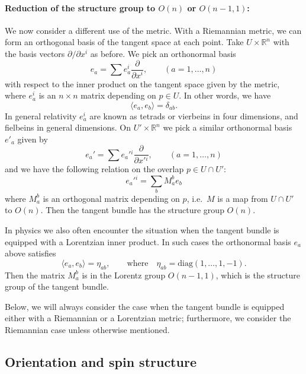 \documentclass[12pt]{article}
\numberwithin{equation}{section}
\numberwithin{figure}{section}
\theoremstyle{remark}
\def\bR{\mathbb{R}}
\begin{document}
\paragraph{Reduction of the structure group to $O(n)$ or $O(n-1,1)$:}
We now consider a different use of the metric.
With a Riemannian metric, we can form an orthogonal basis of the tangent space at each point.
Take $U\times \bR^n$ with the basis vectors $\partial/\partial x^i$ as before.
We pick an orthonormal basis \begin{equation}
  e_a = \sum e_a^i \frac{\partial}{\partial x^i},
  \qquad (a=1,\ldots,n)
\end{equation} with respect to the inner product on the tangent space given by the metric,
where $e_a^i$ is an $n\times n$ matrix depending on $p\in U$.
In other words, we have \begin{equation}
\langle e_a, e_b \rangle = \delta_{ab}.
\end{equation}
In general relativity $e_a^i$ are known as tetrads or vierbeins 
in four dimensions, and fielbeins in general dimensions.
On $U'\times \bR^n$ we pick a similar orthonormal basis $e'_a$
given by \begin{equation}
  e_a' = \sum e_a'{}^i \frac{\partial}{\partial x'{}^i},
  \qquad (a=1,\ldots,n)
\end{equation}
and we have the following relation on the overlap $p\in U\cap U'$:  \begin{equation}
  e_a'{}^i = \sum_b M_a^b e_b
\end{equation} 
where $M_a^b$ is an orthogonal matrix depending on $p$,
i.e.~$M$ is a map from $U\cap U'$ to $O(n)$.
Then the tangent bundle has the structure group $O(n)$.

In physics we also often encounter the situation
when the tangent bundle is equipped with a Lorentzian inner product.
In such cases the orthonormal basis $e_a$ above satisfies
\begin{equation}
  \langle e_a, e_b \rangle = \eta_{ab},\qquad
  \text{where}
  \quad
  \eta_{ab} = \mathrm{diag}(1,\ldots,1,-1).
\end{equation}
Then the matrix $M_a^b$ is in the Lorentz group $O(n-1,1)$,
which is the structure group of the tangent bundle.

Below, we will always consider the case when the tangent bundle is
equipped either with a Riemannian or a Lorentzian metric;
furthermore, we consider the Riemannian case unless otherwise mentioned.

\subsection{Orientation and spin structure}
\end{document}
